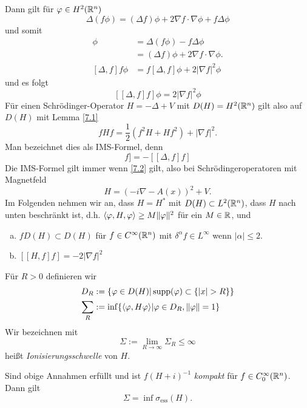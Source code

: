 \documentclass{mycourse}
\begin{document}
Dann gilt für $\varphi \in H^2(\mathbb{R}^n)$
\[
\Delta(f\phi) = (\Delta f) \phi + 2\nabla f \cdot \nabla \phi + f\Delta \phi
\]
und somit
\begin{align*}
[\Delta,f] \phi &= \Delta(f\phi) - f\Delta \phi\\
&= (\Delta f ) \phi + 2\nabla f \cdot \nabla \phi.\\
[\Delta,f] f \phi &= f[\Delta,f] \phi + 2 |\nabla f|^2 \phi
\end{align*}
und es folgt 
\[
[[\Delta,f] f] \phi = 2|\nabla f|^2 \phi
\]
Für einen Schrödinger-Operator $H=-\Delta + V$ mit $D(H)=H^2(\mathbb{R}^n)$ gilt also auf $D(H)$ mit Lemma \ref{7.1}
\begin{equation}
fHf = \frac{1}{2} (f^2 H+ Hf^2) + |\nabla f|^2. \tag{IMS} \label{IMS}
\end{equation}
Man bezeichnet dies als IMS-Formel, denn
\begin{equation} 
[[H,f]f] = -[[\Delta,f] f] \label{7.2}
\end{equation}
Die IMS-Formel gilt immer wenn \eqref{7.2} gilt, also bei Schrödingeroperatoren mit Magnetfeld
\[
H=(-i\nabla -A(x))^2 + V.
\]
Im Folgenden nehmen wir an, dass $H=H^*$ mit $D(H)\subset L^2(\mathbb{R}^n)$, dass $H$ nach unten beschränkt ist, d.h. $\langle \varphi, H, \varphi\rangle\ge M \| \varphi \|^2$ für ein $M\in \mathbb{R}$, und
\begin{enumerate}[a)]
\item $fD(H) \subset D(H)$ für $f\in C^\infty(\mathbb{R}^n)$ mit $\delta^\alpha f \in L^\infty$ wenn $|\alpha| \le 2$.
\item $[[H,f]f] = -2|\nabla f|^2$
\end{enumerate}

Für $R>0$ definieren wir
\begin{align*}
D_R&:= \{\phi \in D(H) | \supp(\phi) \subset \{ |x|>R\}\}\\
\sum_{R}&:=\inf\{\< \phi, H\phi\>| \phi \in D_R, \| \phi \| =1\}
\end{align*}
Wir bezeichnen mit
\[
\Sigma := \lim_{R\to \infty} \Sigma_R \le \infty
\]
heißt \emph{Ionisierungsschwelle} von $H$.
\begin{st}[Persson 1960]
Sind obige Annahmen erfüllt und ist $f(H+i)^{-1}$ \emph{kompakt} für $f\in C_0^\infty(\mathbb{R}^n)$. Dann gilt
\[
\Sigma= \inf \sigma_{\text{ess}}(H).
\] 
\end{st}
\end{document}
